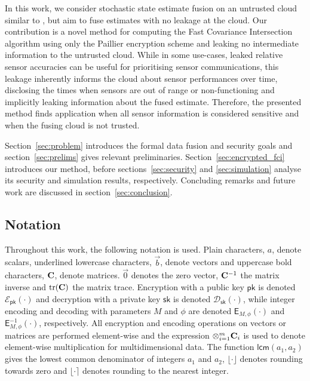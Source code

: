 \documentclass[letterpaper, 10 pt, conference]{ieeeconf}
\begin{document}
In this work, we consider stochastic state estimate fusion on an untrusted cloud similar to \cite{risticSecureFastCovariance2021}, but aim to fuse estimates with no leakage at the cloud. Our contribution is a novel method for computing the Fast Covariance Intersection algorithm using only the Paillier encryption scheme and leaking no intermediate information to the untrusted cloud. While in some use-cases, leaked relative sensor accuracies can be useful for prioritising sensor communications, this leakage inherently informs the cloud about sensor performances over time, disclosing the times when sensors are out of range or non-functioning and implicitly leaking information about the fused estimate. Therefore, the presented method finds application when all sensor information is considered sensitive and when the fusing cloud is not trusted.

Section~\ref{sec:problem} introduces the formal data fusion and security goals and section~\ref{sec:prelims} gives relevant preliminaries. Section~\ref{sec:encrypted_fci} introduces our method, before sections~\ref{sec:security} and \ref{sec:simulation} analyse its security and simulation results, respectively. Concluding remarks and future work are discussed in section~\ref{sec:conclusion}.

\subsection{Notation}
Throughout this work, the following notation is used. Plain characters, $a$, denote scalars, underlined lowercase characters, $\vec{b}$, denote vectors and uppercase bold characters, ${{\mathbf{C}}}$, denote matrices. $\vec{0}$ denotes the zero vector, ${{\mathbf{C}}}^{-1}$ the matrix inverse and $\operatorname{tr}({{\mathbf{C}}})$ the matrix trace. Encryption with a public key $\mathsf{pk}$ is denoted $\mathcal{E}_{\mathsf{pk}}(\cdot)$ and decryption with a private key $\mathsf{sk}$ is denoted $\mathcal{D}_{\mathsf{sk}}(\cdot)$, while integer encoding and decoding with parameters $M$ and $\phi$ are denoted $\mathsf{E}_{M,\phi}(\cdot)$ and $\mathsf{E}^{-1}_{M,\phi}(\cdot)$, respectively. All encryption and encoding operations on vectors or matrices are performed element-wise and the expression $\otimes_{i=1}^{m}{{\mathbf{C}}}_i$ is used to denote element-wise multiplication for multidimensional data. The function $\mathsf{lcm}(a_1,a_2)$ gives the lowest common denominator of integers $a_1$ and $a_2$, $\lfloor\cdot\rfloor$ denotes rounding towards zero and $\lfloor\cdot\rceil$ denotes rounding to the nearest integer.
\end{document}
